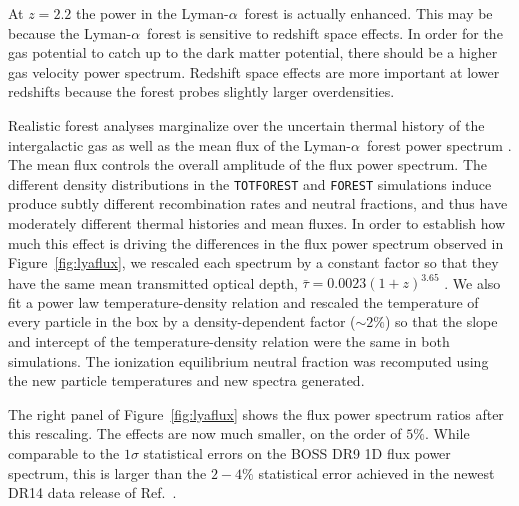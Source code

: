 \documentclass[a4paper,11pt]{article}
\newcommand{\Lya}{Lyman-$\alpha$}
\begin{document}
At $z=2.2$ the power in the \Lya~forest is actually enhanced. This may be because the \Lya~forest is sensitive to redshift space effects. In order for the gas potential to catch up to the dark matter potential, there should be a higher gas velocity power spectrum. Redshift space effects are more important at lower redshifts because the forest probes slightly larger overdensities.

Realistic forest analyses marginalize over the uncertain thermal history of the intergalactic gas as well as the mean flux of the \Lya~forest power spectrum \citep[e.g.][]{PD2013}. The mean flux controls the overall amplitude of the flux power spectrum. The different density distributions in the \texttt{TOTFOREST} and \texttt{FOREST} simulations induce produce subtly different recombination rates and neutral fractions, and thus have moderately different thermal histories and mean fluxes. In order to establish how much this effect is driving the differences in the flux power spectrum observed in Figure~\ref{fig:lyaflux}, we rescaled each spectrum by a constant factor so that they have the same mean transmitted optical depth, $\bar{\tau} = 0.0023 (1 + z)^{3.65}$ \cite{Kim:2007}. We also fit a power law temperature-density relation and rescaled the temperature of every particle in the box by a density-dependent factor ($\sim 2\%$) so that the slope and intercept of the temperature-density relation were the same in both simulations. The ionization equilibrium neutral fraction was recomputed using the new particle temperatures and new spectra generated.

The right panel of Figure~\ref{fig:lyaflux} shows the flux power spectrum ratios after this rescaling. The effects are now much smaller, on the order of $5\%$. While comparable to the $1\sigma$ statistical errors on the BOSS DR9 1D flux power spectrum, this is larger than the $2-4\%$ statistical error achieved in the newest DR14 data release of Ref.~\cite{Chabanier:2019}.

\end{document}
